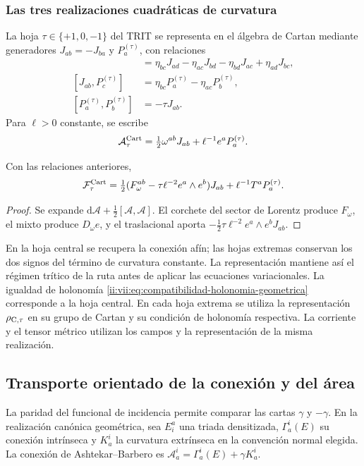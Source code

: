 \subsubsection{Las tres realizaciones cuadráticas de curvatura}

La hoja \(\tau\in\{+1,0,-1\}\) del TRIT se representa en
el álgebra de Cartan mediante generadores \(J_{ab}=-J_{ba}\)
y \(P_a^{(\tau)}\), con relaciones
\begin{align*}
 [J_{ab},J_{cd}]&=
 \eta_{bc}J_{ad}-\eta_{ac}J_{bd}
 -\eta_{bd}J_{ac}+\eta_{ad}J_{bc},\\
 [J_{ab},P_c^{(\tau)}]&=
 \eta_{bc}P_a^{(\tau)}-\eta_{ac}P_b^{(\tau)},\\
 [P_a^{(\tau)},P_b^{(\tau)}]&=-\tau J_{ab}.
\end{align*}
Para \(\ell>0\) constante, se escribe
\[
 \mathcal A_\tau^{\rm Cart}
 =\tfrac12\omega^{ab}J_{ab}+\ell^{-1}e^aP_a^{(\tau)}.
\]

\begin{proposition}
\label{ii:vii:prop:curvatura-tritificada}
Con las relaciones anteriores,
\begin{equation}
 \mathcal F_\tau^{\rm Cart}
 =\tfrac12(F_\omega^{ab}-\tau\ell^{-2}e^a\wedge e^b)J_{ab}
     +\ell^{-1}T^aP_a^{(\tau)}.
 \label{ii:vii:eq:curvatura-tritificada}
\end{equation}
\end{proposition}
\begin{proof}
Se expande \(\mathrm d\mathcal A+\tfrac12[\mathcal A,\mathcal A]\).
El corchete del sector de Lorentz produce \(F_\omega\), el
mixto produce \(D_\omega e\), y el traslacional aporta
\(-\tfrac12\tau\ell^{-2}e^a\wedge e^bJ_{ab}\).
\end{proof}

En la hoja central se recupera la conexión afín; las hojas extremas
conservan los dos signos del término de curvatura constante. La
representación mantiene así el régimen trítico de la ruta antes de
aplicar las ecuaciones variacionales. La igualdad de holonomía
\eqref{ii:vii:eq:compatibilidad-holonomia-geometrica} corresponde a la
hoja central. En cada hoja extrema se utiliza la representación
\(\rho_{{\rm C},\tau}\) en su grupo de Cartan y su condición
de holonomía respectiva. La corriente y el tensor métrico utilizan
los campos y la representación de la misma realización.



\subsection{Transporte orientado de la conexión y del área}
\label{ii:sec:ii-costura-barbero}
La paridad del funcional de incidencia permite comparar las cartas
\(\gamma\) y \(-\gamma\). En la realización canónica geométrica,
sea \(E^a_i\) una triada densitizada, \(\Gamma_a^i(E)\) su
conexión intrínseca y \(K_a^i\) la curvatura extrínseca en la
convención normal elegida. La conexión de Ashtekar--Barbero es
\(\mathcal A_a^i=\Gamma_a^i(E)+\gamma K_a^i\).

